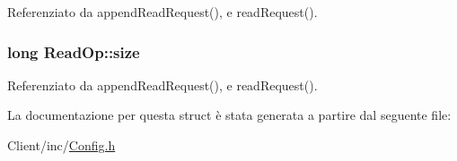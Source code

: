 Referenziato da append\+Read\+Request(), e read\+Request().

\hypertarget{structReadOp_a2562187098302a2641f29f89e77748b0}{
\subsubsection[{size}]{\setlength{\rightskip}{0pt plus 5cm}long Read\+Op\+::size}}\label{structReadOp_a2562187098302a2641f29f89e77748b0}


Referenziato da append\+Read\+Request(), e read\+Request().



La documentazione per questa struct è stata generata a partire dal seguente file\+:\begin{DoxyCompactItemize}
\item 
Client/inc/\hyperlink{Client_2inc_2Config_8h}{Config.\+h}\end{DoxyCompactItemize}
